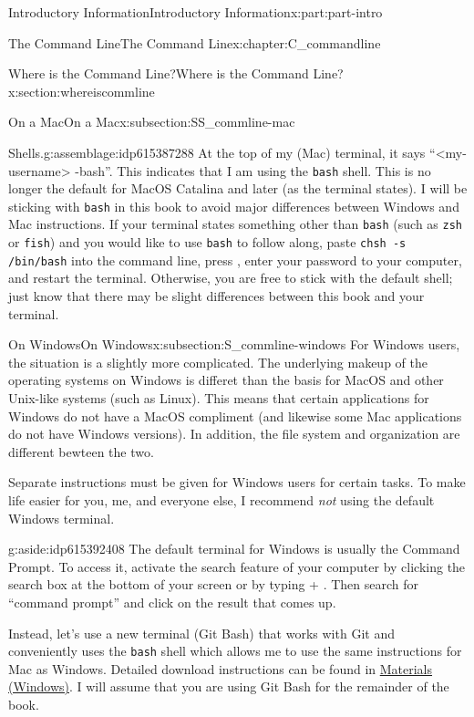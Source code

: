 \documentclass[oneside,10pt,]{book}
\newcommand{\mono}[1]{\texttt{#1}}
\newcommand{\kbd}[1]{\keys{{#1}}}
\begin{document}
\begin{partptx}{Introductory Information}{}{Introductory Information}{}{}{x:part:part-intro}
\begin{chapterptx}{The Command Line}{}{The Command Line}{}{}{x:chapter:C_commandline}
\begin{sectionptx}{Where is the Command Line?}{}{Where is the Command Line?}{}{}{x:section:whereiscommline}
\begin{subsectionptx}{On a Mac}{}{On a Mac}{}{}{x:subsection:SS_commline-mac}
\begin{assemblage}{Shells.}{g:assemblage:idp615387288}
At the top of my (Mac) terminal, it says ``\textless{}my-username\textgreater{}\textemdash{} -bash''. This indicates that I am using the \mono{bash} shell. This is no longer the default for MacOS Catalina and later (as the terminal states). I will be sticking with \mono{bash} in this book to avoid major differences between Windows and Mac instructions. If your terminal states something other than \mono{bash} (such as \mono{zsh} or \mono{fish}) and you would like to use \mono{bash} to follow along, paste \mono{chsh -s /bin/bash}\footnotemark{} into the command line, press \kbd{Enter}, enter your password to your computer, and restart the terminal. Otherwise, you are free to stick with the default shell; just know that there may be slight differences between this book and your terminal.%
\end{assemblage}
%
\end{subsectionptx}
%
%
\typeout{************************************************}
\typeout{************************************************}
%
\begin{subsectionptx}{On Windows}{}{On Windows}{}{}{x:subsection:S_commline-windows}
%
For Windows users, the situation is a slightly more complicated. The underlying makeup of the operating systems on Windows is differet than the basis for MacOS and other Unix-like systems (such as Linux). This means that certain applications for Windows do not have a MacOS compliment (and likewise some Mac applications do not have Windows versions). In addition, the file system and organization are different bewteen the two.%
\par
Separate instructions must be given for Windows users for certain tasks. To make life easier for you, me, and everyone else, I recommend \emph{not} using the default Windows terminal. \begin{aside}{}{g:aside:idp615392408}%
The default terminal for Windows is usually the Command Prompt. To access it, activate the search feature of your computer by clicking the search box at the bottom of your screen or by typing \kbd{Windows} + \kbd{S}. Then search for ``command prompt'' and click on the result that comes up.%
\end{aside}
%
\par
Instead, let's use a new terminal (Git Bash) that works with Git and conveniently uses the \mono{bash} shell which allows me to use the same instructions for Mac as Windows. Detailed download instructions can be found in \hyperref[x:preface:materials-windows]{Materials (Windows)}. I will assume that you are using Git Bash for the remainder of the book.%

\end{subsectionptx}
\end{sectionptx}
\end{chapterptx}
\end{partptx}
\end{document}
